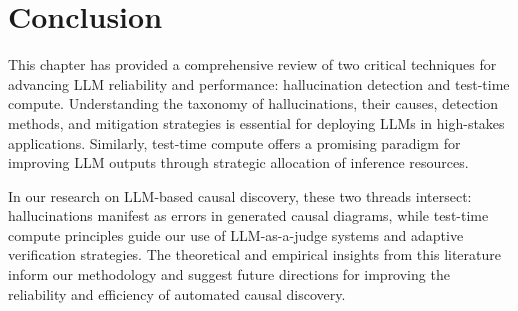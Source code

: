 
\section{Conclusion}

This chapter has provided a comprehensive review of two critical techniques for advancing LLM reliability and performance: hallucination detection and test-time compute. Understanding the taxonomy of hallucinations, their causes, detection methods, and mitigation strategies is essential for deploying LLMs in high-stakes applications. Similarly, test-time compute offers a promising paradigm for improving LLM outputs through strategic allocation of inference resources.

In our research on LLM-based causal discovery, these two threads intersect: hallucinations manifest as errors in generated causal diagrams, while test-time compute principles guide our use of LLM-as-a-judge systems and adaptive verification strategies. The theoretical and empirical insights from this literature inform our methodology and suggest future directions for improving the reliability and efficiency of automated causal discovery.
